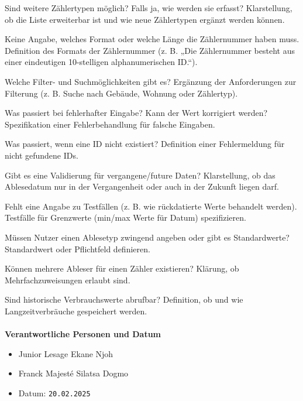 {Sind weitere Zählertypen möglich? Falls ja, wie werden sie erfasst?}
{Klarstellung, ob die Liste erweiterbar ist und wie neue Zählertypen ergänzt werden können.}

{Keine Angabe, welches Format oder welche Länge die Zählernummer haben muss.}
{Definition des Formats der Zählernummer (z. B. „Die Zählernummer besteht aus einer eindeutigen 10-stelligen alphanumerischen ID.“).}

{Welche Filter- und Suchmöglichkeiten gibt es?}
{Ergänzung der Anforderungen zur Filterung (z. B. Suche nach Gebäude, Wohnung oder Zählertyp).}

{Was passiert bei fehlerhafter Eingabe? Kann der Wert korrigiert werden?}
{Spezifikation einer Fehlerbehandlung für falsche Eingaben.}

{Was passiert, wenn eine ID nicht existiert?}
{Definition einer Fehlermeldung für nicht gefundene IDs.}

{Gibt es eine Validierung für vergangene/future Daten?}
{Klarstellung, ob das Ablesedatum nur in der Vergangenheit oder auch in der Zukunft liegen darf.}

{Fehlt eine Angabe zu Testfällen (z. B. wie rückdatierte Werte behandelt werden).}
{Testfälle für Grenzwerte (min/max Werte für Datum) spezifizieren.}

{Müssen Nutzer einen Ablesetyp zwingend angeben oder gibt es Standardwerte?}
{Standardwert oder Pflichtfeld definieren.}

{Können mehrere Ableser für einen Zähler existieren?}
{Klärung, ob Mehrfachzuweisungen erlaubt sind.}

{Sind historische Verbrauchswerte abrufbar?}
{Definition, ob und wie Langzeitverbräuche gespeichert werden.}
\\
\\

\textbf{Verantwortliche Personen und Datum}

\begin{itemize}
	\item Junior Lesage Ekane Njoh
	\item Franck Majesté Silatsa Dogmo
	\item Datum: \texttt{20.02.2025}
\end{itemize}